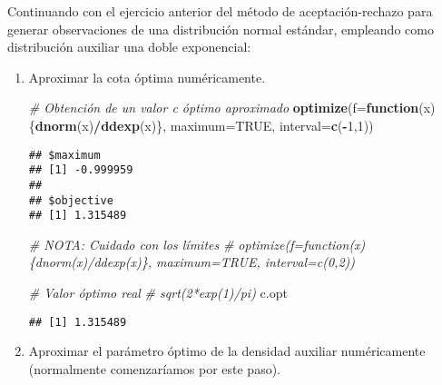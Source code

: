 \documentclass[
]{book}
\newenvironment{Shaded}{\begin{snugshade}}{\end{snugshade}}
\newcommand{\CommentTok}[1]{\textcolor[rgb]{0.56,0.35,0.01}{\textit{#1}}}
\newcommand{\ControlFlowTok}[1]{\textcolor[rgb]{0.13,0.29,0.53}{\textbf{#1}}}
\newcommand{\DataTypeTok}[1]{\textcolor[rgb]{0.13,0.29,0.53}{#1}}
\newcommand{\DecValTok}[1]{\textcolor[rgb]{0.00,0.00,0.81}{#1}}
\newcommand{\KeywordTok}[1]{\textcolor[rgb]{0.13,0.29,0.53}{\textbf{#1}}}
\newcommand{\NormalTok}[1]{#1}
\newcommand{\OperatorTok}[1]{\textcolor[rgb]{0.81,0.36,0.00}{\textbf{#1}}}
\newcommand{\OtherTok}[1]{\textcolor[rgb]{0.56,0.35,0.01}{#1}}
\newcommand{\StringTok}[1]{\textcolor[rgb]{0.31,0.60,0.02}{#1}}
\theoremstyle{break}
\theoremstyle{definition}
\theoremstyle{definition}
\theoremstyle{definition}
\theoremstyle{remark}
\let\BeginKnitrBlock\begin \let\EndKnitrBlock\end
\begin{document}
\BeginKnitrBlock{exercise}
\protect\hypertarget{exr:unnamed-chunk-10}{}{\label{exr:unnamed-chunk-10} }
\EndKnitrBlock{exercise}

Continuando con el ejercicio anterior del método de
aceptación-rechazo para generar observaciones de una
distribución normal estándar, empleando como distribución
auxiliar una doble exponencial:

\begin{enumerate}
\def\labelenumi{\alph{enumi})}
\setcounter{enumi}{2}
\item
  Aproximar la cota óptima numéricamente.

\begin{Shaded}
\begin{Highlighting}[]
\CommentTok{# Obtención de un valor c óptimo aproximado}
\KeywordTok{optimize}\NormalTok{(}\DataTypeTok{f=}\ControlFlowTok{function}\NormalTok{(x)\{}\KeywordTok{dnorm}\NormalTok{(x)}\OperatorTok{/}\KeywordTok{ddexp}\NormalTok{(x)\}, }\DataTypeTok{maximum=}\OtherTok{TRUE}\NormalTok{, }\DataTypeTok{interval=}\KeywordTok{c}\NormalTok{(}\OperatorTok{-}\DecValTok{1}\NormalTok{,}\DecValTok{1}\NormalTok{))}
\end{Highlighting}
\end{Shaded}

\begin{verbatim}
## $maximum
## [1] -0.999959
## 
## $objective
## [1] 1.315489
\end{verbatim}

\begin{Shaded}
\begin{Highlighting}[]
\CommentTok{# NOTA: Cuidado con los límites}
\CommentTok{# optimize(f=function(x)\{dnorm(x)/ddexp(x)\}, maximum=TRUE, interval=c(0,2))}

\CommentTok{# Valor óptimo real}
\CommentTok{# sqrt(2*exp(1)/pi)}
\NormalTok{c.opt}
\end{Highlighting}
\end{Shaded}

\begin{verbatim}
## [1] 1.315489
\end{verbatim}
\item
  Aproximar el parámetro óptimo de la densidad auxiliar
  numéricamente (normalmente comenzaríamos por este paso).

\begin{Shaded}
\end{Shaded}
\end{enumerate}
\end{document}
